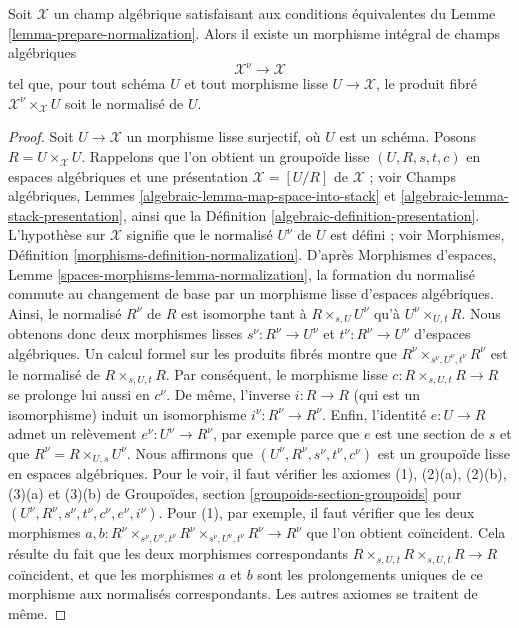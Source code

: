 \begin{lemma}
\label{lemma-normalization}
Soit $\mathcal{X}$ un champ algébrique satisfaisant aux
conditions équivalentes du Lemme \ref{lemma-prepare-normalization}.
Alors il existe un morphisme intégral de champs algébriques
$$
\mathcal{X}^\nu \longrightarrow \mathcal{X}
$$
tel que, pour tout schéma $U$ et tout morphisme lisse $U \to \mathcal{X}$,
le produit fibré $\mathcal{X}^\nu \times_\mathcal{X} U$
soit le normalisé de $U$.
\end{lemma}

\begin{proof}
Soit $U \to \mathcal{X}$ un morphisme lisse surjectif, où $U$ est un schéma.
Posons $R = U \times_\mathcal{X} U$. Rappelons que l'on obtient un groupoïde lisse
$(U, R, s, t, c)$ en espaces algébriques et une présentation
$\mathcal{X} = [U/R]$ de $\mathcal{X}$ ; voir Champs algébriques,
Lemmes \ref{algebraic-lemma-map-space-into-stack} et
\ref{algebraic-lemma-stack-presentation}, ainsi que la
Définition \ref{algebraic-definition-presentation}.
L'hypothèse sur $\mathcal{X}$ signifie que le normalisé
$U^\nu$ de $U$ est défini ; voir Morphismes, Définition
\ref{morphisms-definition-normalization}.
D'après Morphismes d'espaces, Lemme
\ref{spaces-morphisms-lemma-normalization},
la formation du normalisé commute au changement de base par un morphisme lisse
d'espaces algébriques. Ainsi, le normalisé $R^\nu$ de $R$
est isomorphe tant à $R \times_{s, U} U^\nu$ qu'à $U^\nu \times_{U, t} R$.
Nous obtenons donc deux morphismes lisses
$s^\nu : R^\nu \to U^\nu$ et $t^\nu : R^\nu \to U^\nu$
d'espaces algébriques. Un calcul formel sur les produits fibrés montre que
$R^\nu \times_{s^\nu, U^\nu, t^\nu} R^\nu$ est le normalisé
de $R \times_{s, U, t} R$. Par conséquent, le morphisme lisse
$c : R \times_{s, U, t} R \to R$ se prolonge lui aussi en $c^\nu$.
De même, l'inverse $i : R \to R$ (qui est un isomorphisme) induit
un isomorphisme $i^\nu : R^\nu \to R^\nu$. Enfin, l'identité
$e : U \to R$ admet un relèvement $e^\nu : U^\nu \to R^\nu$, par exemple
parce que $e$ est une section de $s$ et que $R^\nu = R \times_{U, s} U^\nu$.
Nous affirmons que $(U^\nu, R^\nu, s^\nu, t^\nu, c^\nu)$ est
un groupoïde lisse en espaces algébriques. Pour le voir, il faut vérifier
les axiomes (1), (2)(a), (2)(b), (3)(a) et (3)(b) de
Groupoïdes, section \ref{groupoids-section-groupoids}
pour $(U^\nu, R^\nu, s^\nu, t^\nu, c^\nu, e^\nu, i^\nu)$.
Pour (1), par exemple, il faut vérifier que les deux morphismes
$a, b : R^\nu \times_{s^\nu, U^\nu, t^\nu} R^\nu
\times_{s^\nu, U^\nu, t^\nu} R^\nu \to R^\nu$ que l'on obtient coïncident.
Cela résulte du fait que les deux morphismes correspondants
$R \times_{s, U, t} R \times_{s, U, t} R \to R$
coïncident, et que les morphismes $a$ et $b$ sont les prolongements uniques
de ce morphisme aux normalisés correspondants. Les autres
axiomes se traitent de même.


\end{proof}
